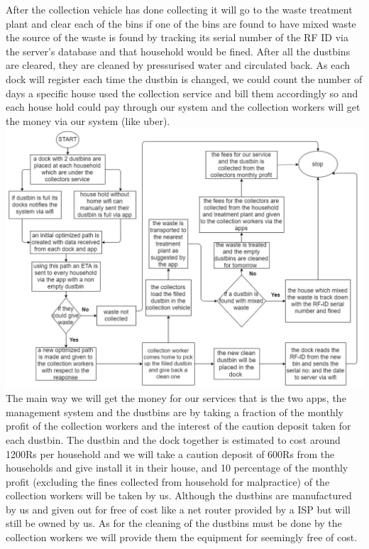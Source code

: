 \normalsize {After the collection vehicle has done collecting it will go to the waste treatment plant and clear each of the bins if one of the bins are found to have mixed waste the source of the waste is found by tracking its serial number of the RF ID via the server’s database and that household would be fined. After all the dustbins are cleared, they are cleaned by pressurised water and circulated back. As each dock will register each time the dustbin is changed, we could count the number of days a specific house used the collection service and bill them accordingly so and each house hold could pay through our system and the collection workers will get the money via our system (like uber).}\\[0.01in]

\includegraphics[width=\linewidth]{flow.jpg}\\[0.3in]


\normalsize {The main way we will get the money for our services that is the two apps, the management system and the dustbins are by taking a fraction of the monthly profit of the collection workers and the interest of the caution deposit taken for each dustbin. The dustbin and the dock together is estimated to cost around 1200Rs per household and we will take a caution deposit of 600Rs from the households and give install it in their house, and 10 percentage of the monthly profit (excluding the fines collected from household for malpractice) of the collection workers will be taken by us. Although the dustbins are manufactured by us and given out for free of cost like a net router provided by a ISP but will still be owned by us. As for the cleaning of the dustbins must be done by the collection workers we will provide them the equipment for seemingly free of cost.
}\\[0.1in]


	
\newpage
